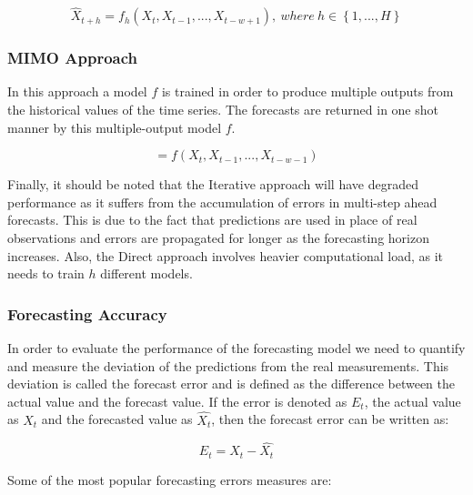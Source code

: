 \documentclass[a4paper, 12pt]{article}
\numberwithin{equation}{section}
\numberwithin{figure}{section}
\numberwithin{table}{section}
\begin{document}
	\begin{equation}
			\hat X_{t+h} = f_{h}(X_t, X_{t-1}, ..., X_{t-w+1}), \ where \  h \in \left\{1, ..., H\right\}
	\end{equation}
	
	\subsubsection*{MIMO Approach}
	
	In this approach a model $f$ is trained in order to produce multiple outputs from the historical values of the time series. The forecasts are returned in one shot manner by this multiple-output model $f$.
	
	\begin{equation}
		[\hat{X}_{t+h}, \hat{X}_{t+h-1}, ..., \hat{X}_{t+1}] = f(X_t, X_{t-1}, ..., X_{t-w-1})
	\end{equation}
	
	\vspace*{0.5cm}
	
	Finally, it should be noted that the Iterative approach will have degraded performance as it suffers from the accumulation of errors in multi-step ahead forecasts. This is due to the fact that predictions are used in place of real observations and errors are propagated for longer as the forecasting horizon increases. Also, the Direct approach involves heavier computational load, as it needs to train $h$ different models.

	\subsubsection{Forecasting Accuracy}
	
	In order to evaluate the performance of the forecasting model we need to quantify and measure the deviation of the predictions from the real measurements. This deviation is called the forecast error and is defined as the difference between the actual value and the forecast value. If the error is denoted as $E_t$, the actual value as $X_t$ and the forecasted value as $\hat{X_t}$, then the forecast error can be written as:
	
	\begin{equation}
		E_t = X_t - \hat{X_t}
	\end{equation}
	
	\vspace*{0.5cm}
	
	\noindent Some of the most popular forecasting errors measures are:
	
\end{document}
